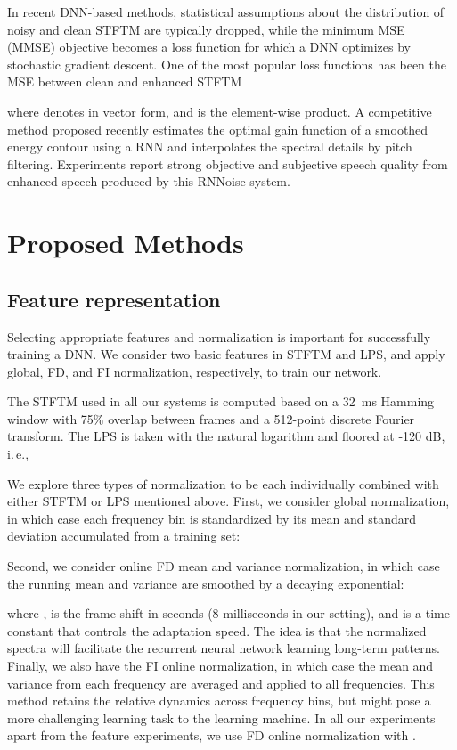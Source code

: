 \documentclass{article}
\begin{document}
In recent DNN-based methods, statistical assumptions about the distribution of noisy and clean \ac{STFTM} are typically dropped, while the minimum \ac{MSE} (MMSE) objective becomes a loss function for which a DNN optimizes by stochastic gradient descent. One of the most popular loss functions has been the \ac{MSE} between clean and enhanced \ac{STFTM}

where  denotes  in vector form, and  is the element-wise product. A competitive method proposed recently \cite{valin2018hybrid} estimates the optimal gain function of a smoothed energy contour using a \ac{RNN} and interpolates the spectral details by pitch filtering. Experiments \cite{valin2018hybrid,Reddy2019} report strong objective and subjective speech quality from enhanced speech produced by this RNNoise system.

\section{Proposed Methods}
\label{sec:method}

\subsection{Feature representation}

Selecting appropriate features and normalization is important for successfully training a DNN. We consider two basic features in \ac{STFTM} and \ac{LPS}, and apply global, \ac{FD}, and \ac{FI} normalization, respectively, to train our network.

The \ac{STFTM} used in all our systems is computed based on a 32~ms Hamming window with 75\% overlap between frames and a 512-point discrete Fourier transform. The \ac{LPS} is taken with the natural logarithm and floored at -120 dB, i.\,e.,

We explore three types of normalization to be each individually combined with either \ac{STFTM} or \ac{LPS} mentioned above. First, we consider global normalization, in which case each frequency bin is standardized by its mean and standard deviation accumulated from a training set:

Second, we consider online \ac{FD} mean and variance normalization, in which case the running mean and variance are smoothed by a decaying exponential:

where ,  is the frame shift in seconds (8 milliseconds in our setting), and  is a time constant that controls the adaptation speed. The idea is that the normalized spectra will facilitate the recurrent neural network learning long-term patterns. Finally, we also have the \ac{FI} online normalization, in which case the mean and variance from each frequency are averaged and applied to all frequencies. This method retains the relative dynamics across frequency bins, but might pose a more challenging learning task to the learning machine. In all our experiments apart from the feature experiments, we use \ac{FD} online normalization with .
\end{document}
